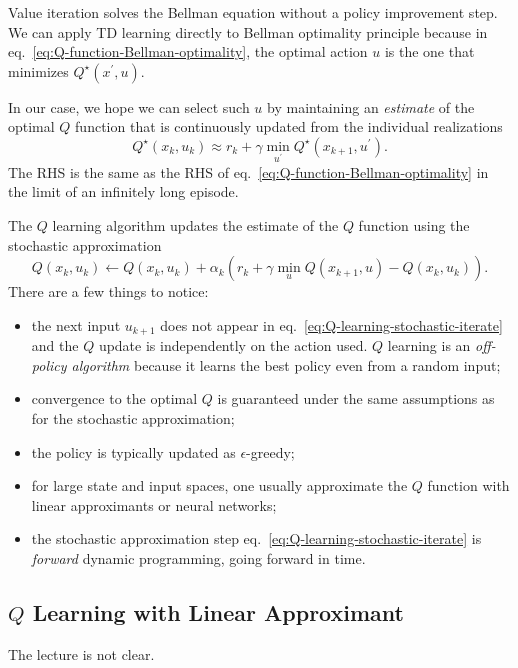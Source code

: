 Value iteration solves the Bellman equation without a policy improvement step. We can apply TD learning directly to Bellman optimality principle because in eq.~\eqref{eq:Q-function-Bellman-optimality}, the optimal action $u$ is the one that minimizes $Q^\star(x^\prime,u)$.

In our case, we hope we can select such $u$ by maintaining an \emph{estimate} of the optimal $Q$ function that is continuously updated from the individual realizations
\begin{equation*}
  Q^\star(x_k,u_k) \approx r_k + \gamma \min_{u^\prime} Q^\star(x_{k+1},u^\prime).
\end{equation*}
The RHS is the same as the RHS of eq.~\eqref{eq:Q-function-Bellman-optimality} in the limit of an infinitely long episode.

The $Q$ learning algorithm updates the estimate of the $Q$ function using the stochastic approximation
\begin{equation}
  \label{eq:Q-learning-stochastic-iterate}
  Q(x_k,u_k) \leftarrow Q(x_k,u_k) + \alpha_k\left(r_k + \gamma \min_u Q(x_{k+1},u) - Q(x_k,u_k)\right).
\end{equation}
There are a few things to notice:
\begin{itemize}
\item the next input $u_{k+1}$ does not appear in eq.~\eqref{eq:Q-learning-stochastic-iterate} and the $Q$ update is independently on the action used. $Q$ learning is an \emph{off-policy algorithm} because it learns the best policy even from a random input;
\item convergence to the optimal $Q$ is guaranteed under the same assumptions as for the stochastic approximation;
\item the policy is typically updated as $\epsilon$-greedy;
\item for large state and input spaces, one usually approximate the $Q$ function with linear approximants or neural networks;
\item the stochastic approximation step eq.~\eqref{eq:Q-learning-stochastic-iterate} is \emph{forward} dynamic programming, going forward in time.
\end{itemize}

\subsection{$Q$ Learning with Linear Approximant}

The lecture is not clear.

